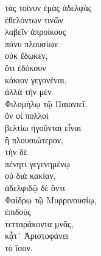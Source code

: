 {\large
\begin{greek}
\noindent τὰς τοίνυν ἐμὰς ἀδελφὰς \\
\tabto{2em} ἐθελόντων τινῶν \\
\tabto{4em} λαβεῖν ἀπροίκους \\
\tabto{2em} πάνυ πλουσίων \\
οὐκ ἔδωκεν, \\
\tabto{2em} ὅτι ἐδόκουν \\
\tabto{4em} κάκιον γεγονέναι, \\
ἀλλὰ τὴν μὲν \\
\tabto{2em} Φιλομήλῳ τῷ Παιανιεῖ, \\
\tabto{4em} ὃν οἱ πολλοὶ \\
\tabto{4em} βελτίω ἡγοῦνται εἶναι\\
\tabto{4em} ἢ πλουσιώτερον, \\

τὴν δὲ \\
\tabto{2em} πένητι γεγενημένῳ \\
\tabto{4em} οὐ διὰ κακίαν, \\
\tabto{2em} ἀδελφιδῷ δὲ ὄντι \\
\tabto{2em} Φαίδρῳ τῷ Μυρρινουσίῳ, \\
ἐπιδοὺς \\
\tabto{2em} τετταράκοντα μνᾶς, \\
κᾆτ´ Ἀριστοφάνει \\
\tabto{2em} τὸ ἴσον.\\

\end{greek}
}

